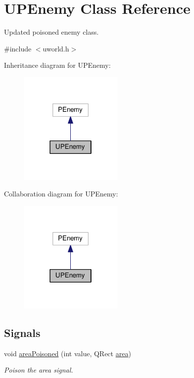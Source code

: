 \hypertarget{classUPEnemy}{}\section{U\+P\+Enemy Class Reference}
\label{classUPEnemy}


Updated poisoned enemy class.  




{\ttfamily \#include $<$uworld.\+h$>$}



Inheritance diagram for U\+P\+Enemy\+:\nopagebreak
\begin{figure}[H]
\begin{center}
\leavevmode
\includegraphics[width=142pt]{da/dff/classUPEnemy__inherit__graph}
\end{center}
\end{figure}


Collaboration diagram for U\+P\+Enemy\+:\nopagebreak
\begin{figure}[H]
\begin{center}
\leavevmode
\includegraphics[width=142pt]{d3/dfe/classUPEnemy__coll__graph}
\end{center}
\end{figure}
\subsection*{Signals}
\begin{DoxyCompactItemize}
\item 
void \hyperlink{classUPEnemy_ac021d11a175d2f07c2055a4c8aace52d}{area\+Poisoned} (int value, Q\+Rect \hyperlink{classUPEnemy_aa87ac038b30dccbad0a0966824d99382}{area})
\begin{DoxyCompactList}\small\item\em Poison the area signal. \end{DoxyCompactList}\end{DoxyCompactItemize}
